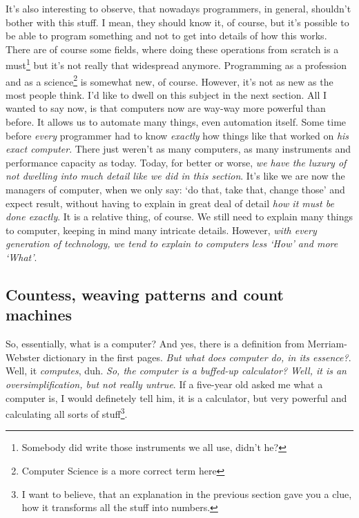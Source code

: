 \documentclass{article}
\begin{document}
            It's also interesting to observe, that nowadays programmers, in general, shouldn't bother with this stuff. I mean, they should know it, of course, but it's possible
            to be able to program something and not to get into details of how this works. There are of course some fields, where doing these operations from scratch 
            is a must\footnote{Somebody did write those instruments we all use, didn't he?} but it's not really that widespread anymore. Programming as a profession and as 
            a science\footnote{Computer Science is a more correct term here} is somewhat new, of course. However, it's not as new as the most people think. I'd like to dwell
            on this subject in the next section. All I wanted to say now, is that computers now are way-way more powerful than before. It allows us to automate many things, even
            automation itself. Some time before \emph{every} programmer had to know \emph{exactly} how things like that worked on \emph{his exact computer}. There just 
            weren't as many computers, as many instruments and performance capacity as today. Today, for better or worse, \emph{we have the luxury of not dwelling into much
            detail like we did in this section}. It's like we are now the managers of computer, when we only say: `do that, take that, change those' and expect result, without
            having to explain in great deal of detail \emph{how it must be done exactly}. It is a relative thing, of course. We still need to explain many things to computer,
            keeping in mind many intricate details. However, \emph{with every generation of technology, we tend to explain to computers less `How' and more `What'}.

            \newpage
        \subsection{Countess, weaving patterns and count machines}

            So, essentially, what is a computer? And yes, there is a definition from Merriam-Webster dictionary in the first pages. \emph{But what does computer do, in its essence?}.
            Well, it \emph{computes}, duh. \emph{So, the computer is a buffed-up calculator? Well, it is an oversimplification, but not really untrue}. If a five-year old asked me
            what a computer is, I would definetely tell him, it is a calculator, but very powerful and calculating all sorts of stuff\footnote{I want to believe, that an explanation in 
            the previous section gave you a clue, how it transforms all the stuff into numbers.}. \par
\end{document}
